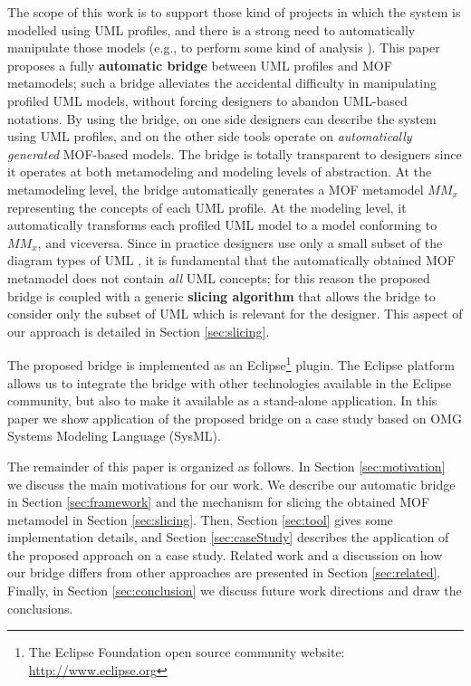 The scope of this work is to support those kind of projects in which the system is modelled using UML profiles, and there is a strong need to 
automatically manipulate those models (e.g., to perform some kind of analysis \cite{UMLprofilesAnalysis}).
This paper proposes a fully \textbf{automatic bridge} between UML profiles and MOF metamodels; such a bridge alleviates the accidental difficulty in manipulating profiled UML models, without forcing designers to abandon UML-based notations.
By using the bridge, on one side designers can describe the system using UML profiles, and on the other side tools operate
on \textit{automatically generated} MOF-based models.
The bridge is totally transparent to designers since it operates at both metamodeling and modeling levels of abstraction.
At the metamodeling level, the bridge automatically generates a MOF metamodel $MM_x$ representing the concepts of each UML profile.
At the modeling level, it automatically transforms each profiled UML model to a model conforming to $MM_x$, and viceversa.
Since in practice designers use only a small subset of the diagram types of UML \cite{france}, 
it is fundamental that the automatically obtained MOF metamodel does not contain \textit{all} UML concepts;
for this reason the proposed bridge is coupled with a generic \textbf{slicing algorithm} that allows the bridge to consider only the subset of UML which is relevant for the designer. This aspect of our approach is detailed in Section \ref{sec:slicing}. 

The proposed bridge is implemented as an Eclipse\footnote{The Eclipse Foundation open source community website: 
\small{\url{http://www.eclipse.org}}} plugin. The Eclipse platform allows us to integrate the bridge 
with other technologies available in the Eclipse community, but also to make it available as a stand-alone application.
In this paper we show application of the proposed bridge on a case study based on OMG Systems Modeling Language (SysML).

The remainder of this paper is organized as follows. In Section \ref{sec:motivation} we discuss the main motivations for our work.
We describe our automatic bridge in Section \ref{sec:framework} and the mechanism for slicing the obtained MOF metamodel 
in Section \ref{sec:slicing}. 
Then, Section \ref{sec:tool} gives some implementation details, and Section \ref{sec:caseStudy} describes the application of
the proposed approach on a case study. Related work and a discussion on how our bridge differs from other approaches
are presented in Section \ref{sec:related}. 
Finally, in Section \ref{sec:conclusion} we discuss future work directions and draw the conclusions. 

















